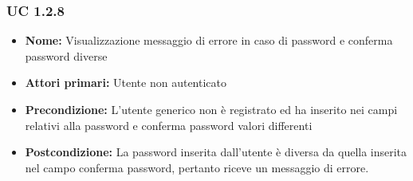 \documentclass[a4paper, oneside, dvipsnames, table]{article} %
\begin{document}
\subsubsection{UC 1.2.8}%
\begin{itemize}
\item \textbf{Nome:}  Visualizzazione messaggio di errore in caso di password e conferma password diverse
\item \textbf{Attori primari:} Utente non autenticato
\item \textbf{Precondizione:} L’utente generico non è registrato ed ha inserito nei campi relativi alla password e conferma password valori differenti
\item \textbf{Postcondizione:} La password inserita dall’utente è diversa da quella inserita nel campo conferma password, pertanto riceve un messaggio di errore.
\end{itemize}
\end{document}
